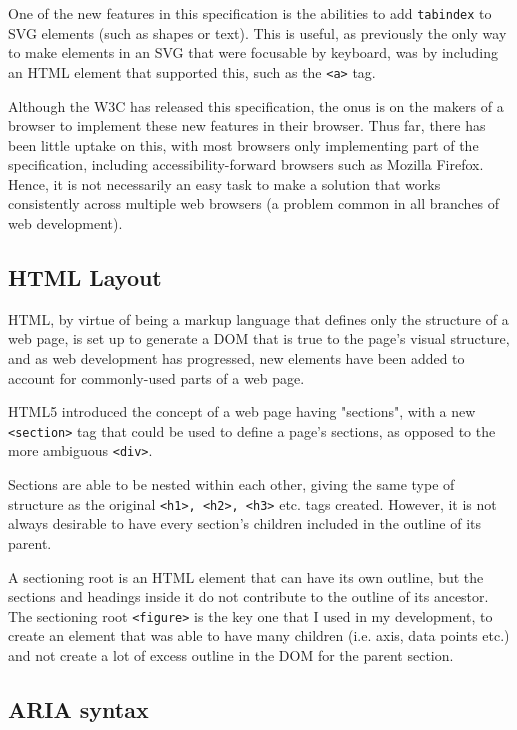 \documentclass[ %
                    author={Aleena Baig},
                supervisor={Dr Simon Lock},
                    degree={BSc},
                     title={On Making Web Accessible Graphs},
                  subtitle={},
                      year={2019} ]{dissertation}
\begin{document}
One of the new features in this specification is the abilities to add \texttt{tabindex} to SVG elements (such as shapes or text). This is useful, as previously the only way to make elements in an SVG that were focusable by keyboard, was by including an HTML element that supported this, such as the \texttt{<a>} tag.

Although the W3C has released this specification, the onus is on the makers of a browser to implement these new features in their browser. Thus far, there has been little uptake on this, with most browsers only implementing part of the specification, including accessibility-forward browsers such as Mozilla Firefox. Hence, it is not necessarily an easy task to make a solution that works consistently across multiple web browsers (a problem common in all branches of web development).

\subsection{HTML Layout}

HTML, by virtue of being a markup language that defines only the structure of a web page, is set up to generate a DOM that is true to the page's visual structure, and as web development has progressed, new elements have been added to account for commonly-used parts of a web page.

HTML5 introduced the concept of a web page having "sections", with a new \texttt{<section>} tag that could be used to define a page's sections, as opposed to the more ambiguous \texttt{<div>}.

Sections are able to be nested within each other, giving the same type of structure as the original \texttt{<h1>, <h2>, <h3>} etc. tags created. However, it is not always desirable to have every section's children included in the outline of its parent.

A sectioning root is an HTML element that can have its own outline, but the sections and headings inside it do not contribute to the outline of its ancestor. The sectioning root \texttt{<figure>} is the key one that I used in my development, to create an element that was able to have many children (i.e. axis, data points etc.) and not create a lot of excess outline in the DOM for the parent section.


\subsection{ARIA syntax}
\end{document}

